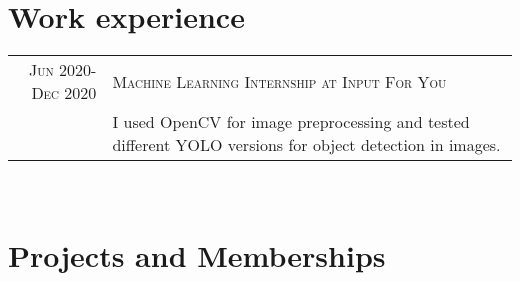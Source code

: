 \documentclass[a4paper,10pt]{article} %
\begin{document}

\section{Work experience}

\begin{tabular}{r|p{11cm}}
  \textsc{Jun 2020-Dec 2020}  & \textsc{Machine Learning Internship at Input For You} \\
  & \footnotesize I used OpenCV for image preprocessing and tested different YOLO versions for object detection in images.
\end{tabular}\\



\section{Projects and Memberships}
\end{document}
